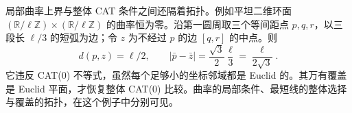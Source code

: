局部曲率上界与整体 CAT 条件之间还隔着拓扑。例如平坦二维环面 \((\mathbb R/\ell\mathbb Z)\times(\mathbb R/\ell\mathbb Z)\) 的曲率恒为零。沿第一圆周取三个等间距点 \(p,q,r\)，以三段长 \(\ell/3\) 的短弧为边；令 \(z\) 为不经过 \(p\) 的边 \([q,r]\) 的中点。则
\[
	d(p,z)=\ell/2,\qquad
	|\bar p-\bar z|=\frac{\sqrt3}{2}\frac\ell3
	=\frac{\ell}{2\sqrt3}.
\]
它违反 CAT(0) 不等式，虽然每个足够小的坐标邻域都是 Euclid 的。其万有覆盖是 Euclid 平面，才恢复整体 CAT(0) 比较。曲率的局部条件、最短线的整体选择与覆盖的拓扑，在这个例子中分别可见。

